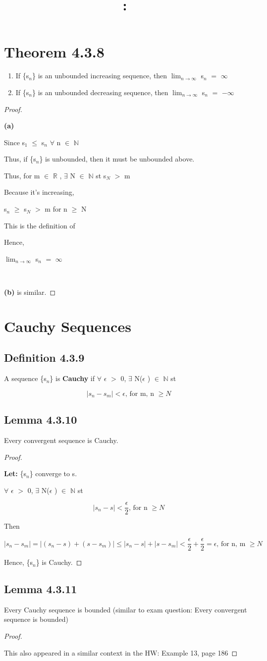 \documentclass{article}
\title{
    \vspace{2in}
    \textmd{\textbf{\hmwkClass:\ \hmwkTitle}}\\
    \normalsize\vspace{0.1in}\small\vspace{0.1in}\large{\textit{\hmwkClassInstructor}}
    \vspace{3in}
}
\author{\hmwkAuthorName}
\date{}
\newcommand{\mt}[1]{\ensuremath{#1}}
\newcommand\bsc[2][\DefaultOpt]{%
  \def\DefaultOpt{#2}%
  \section[#1]{#2}%
}
\newcommand\ssc[2][\DefaultOpt]{%
  \def\DefaultOpt{#2}%
  \subsection[#1]{#2}%
}
\newcommand{\bgpf}{\begin{proof} $ $\newline}
\newcommand{\balist}{\begin{enumerate}[label=\alph*.]}
\newcommand{\elist}{\end{enumerate}}
\newcommand{\lt}[1]{\textbf{Let: } #1}
\newcommand{\bpth}[1]{\textbf{(#1)}}
\newcommand{\epf}{\end{proof}}
\newcommand{\br}{\mt{\mathbb{R}} }       %
\newcommand{\bn}{\mt{\mathbb{N}} }       %
\newcommand{\ep}{\mt{\epsilon} }         %
\newcommand{\fa}{\mt{\forall} }          %
\newcommand{\mem}{\mt{\in} }
\newcommand{\exs}{\mt{\exists} }
\newcommand{\bk}[1]{\{#1\}}
\newcommand{\gr}{\mt{>} }
\newcommand{\lse}{\mt{\leq} }
\newcommand{\gre}{\mt{\geq} }
\newcommand{\eql}{\mt{=} }
\newcommand{\uw}[2]{#1\mt{_{#2}}}
\newcommand{\lmti}[1]{\mt{\displaystyle{\lim_{#1 \to \infty}}}}
\newcommand{\eqn}[1]{\[#1\]}
\begin{document}
\bsc{Theorem 4.3.8}{

\balist
\item If \bk{\uw{s}{n}} is an unbounded increasing sequence, then \lmti{n} \uw{s}{n} \eql $\infty$
\item If \bk{\uw{s}{n}} is an unbounded decreasing sequence, then \lmti{n} \uw{s}{n} \eql $-\infty$
\elist

\bgpf

\bpth{a}

Since \uw{s}{1} \lse \uw{s}{n} \fa n \mem \bn 

Thus, if \bk{\uw{s}{n}} is unbounded, then it must be unbounded above.

Thus, for m \mem \br, \exs N \mem \bn st \uw{s}{N} \gr m

Because it's increasing,

\uw{s}{n} \gre \uw{s}{N} \gr m for n \gre N

This is the definition of

Hence,

\lmti{n} \uw{s}{n} \eql $\infty$ \

\

\bpth{b} is similar.

\epf

}

\bsc{Cauchy Sequences}{

\ssc{Definition 4.3.9}{

A sequence \bk{\uw{s}{n}} is \textbf{Cauchy} if \fa \ep \gr 0, \exs N(\ep) \mem \bn st

\eqn{|s_n - s_m| < \ep\textrm{, for m, n }\gre N}

}

\ssc{Lemma 4.3.10}{

Every convergent sequence is Cauchy.

\bgpf

\lt{\bk{\uw{s}{n}} converge to s.}

\fa \ep \gr 0, \exs N(\ep) \mem \bn st 

\eqn{|s_n - s| < \frac{\epsilon}{2}\textrm{, for n }\gre N}

Then

\eqn{|s_n - s_m| = |(s_n - s) + (s - s_m)| \lse |s_n - s| + |s - s_m| < \frac{\epsilon}{2} + \frac{\epsilon}{2} = \ep\textrm{, for n, m }\gre N}

Hence, \bk{\uw{s}{n}} is Cauchy.
\epf

}

\ssc{Lemma 4.3.11}{

Every Cauchy sequence is bounded (similar to exam question: Every convergent sequence is bounded)

\bgpf

This also appeared in a similar context in the HW: Example 13, page 186

\epf

}

}
\end{document}
